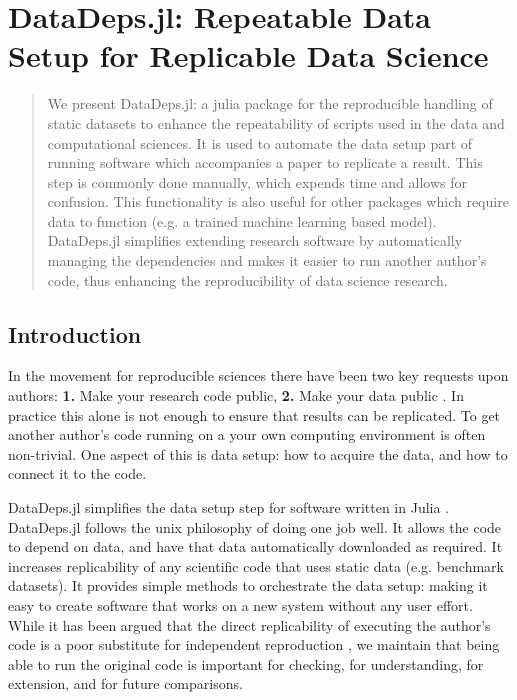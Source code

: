 \documentclass{book}
\begin{document}
\newcommand{\datadep}[1]{\texttt{datadep"{}#1"{}}}




\chapter{DataDeps.jl: Repeatable Data Setup  for Replicable Data Science}

\begin{abstract}
	We present DataDeps.jl: a julia package for the reproducible handling of static datasets to enhance the repeatability of scripts used in the data and computational sciences.
	It is used to automate the data setup part of running software which accompanies a paper to replicate a result.
	This step is commonly done manually, which expends time and allows for confusion.
	This functionality is also useful for other packages which require data to function (e.g. a trained machine learning based model).
	DataDeps.jl simplifies extending research software by automatically managing the dependencies and makes it easier to run another author's code, thus enhancing the reproducibility of data science research.
\end{abstract}


\section{Introduction}

In the movement for reproducible sciences there have been two key requests upon authors:
\textbf{1.} Make your research code public, \textbf{2.} Make your data public \citep{lookafterdata}.
In practice this alone is not enough to ensure that results can be replicated.
To get another author's code running on a your own computing environment is often non-trivial.
One aspect of this is data setup: how to acquire the data, and how to connect it to the code.

DataDeps.jl simplifies the data setup step for software written in Julia \citep{Julia}.
DataDeps.jl follows the unix philosophy of doing one job well.
It allows the code to depend on data, and have that data automatically downloaded as required.
It increases replicability of any scientific code that uses static data (e.g. benchmark datasets).
It provides simple methods to orchestrate the data setup: making it easy to create software that works on a new system without any user effort.
While it has been argued that the direct replicability of executing the author's code is a poor substitute for independent reproduction \citep{drummond2009replicability},
we maintain that being able to run the original code is important for checking, for understanding, for extension, and for future comparisons.
\end{document}
